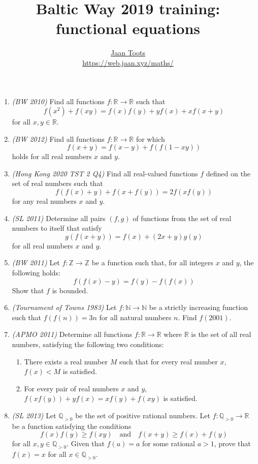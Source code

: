 \documentclass[a4paper]{article}
\title{Baltic Way 2019 training: functional equations}
\author{\href{mailto:jaan@jaan.xyz}{Jaan Toots} \\
\url{https://web.jaan.xyz/maths/}}
\date{\DTMdate{2019-11-14}}
\newcommand{\reals}{\ensuremath{\mathbb{R}}}
\newcommand{\ints}{\ensuremath{\mathbb{Z}}}
\newcommand{\nats}{\ensuremath{\mathbb{N}}}
\newcommand{\rats}{\ensuremath{\mathbb{Q}}}
\begin{document}
\maketitle

\begin{enumerate}

\item \emph{(BW 2010)} Find all functions $f : \reals \to \reals$ such that
$$ f(x^2) +f(xy) =f(x)f(y) +yf(x) +xf(x+y) $$ for all $x,y \in \reals$.

\item \emph{(BW 2012)} Find all functions $f : \reals \to \reals$ for
which $$f(x+y) = f(x-y) + f(f(1-xy))$$ holds for all real numbers $x$ and $y$.

\item \emph{(Hong Kong 2020 TST 2 Q4)} Find all real-valued functions $f$
defined on the set of real numbers such that $$f(f(x)+y)+f(x+f(y))=2f(xf(y))$$
for any real numbers $x$ and $y$.

\item \emph{(SL 2011)} Determine all pairs $(f, g)$ of functions from the set
of real numbers to itself that satisfy $$g(f(x+y)) = f(x) + (2x+y)g(y)$$ for
all real numbers $x$ and $y$.

\item \emph{(BW 2011)} Let $f : \ints \to \ints$ be a function such that, for
all integers $x$ and $y$, the following holds: $$ f(f(x)-y) = f(y)-f(f(x)) $$
Show that $f$ is bounded.

\item \emph{(Tournament of Towns 1983)} Let $f: \nats \to \nats$ be a strictly
increasing function such that $f(f(n))=3n$ for all natural numbers $n$. Find
$f(2001)$.

\item \emph{(APMO 2011)} Determine all functions $f : \reals \to \reals$ where
\reals{} is the set of all real numbers, satisfying the following two conditions:
\begin{enumerate}
\item There exists a real number $M$ such that for every real number $x$, $f(x)
< M$ is satisfied.
\item For every pair of real numbers $x$ and $y$, $f(xf(y))+yf(x) =
xf(y)+f(xy)$ is satisfied.
\end{enumerate}

\item \emph{(SL 2013)} Let $\rats_{>0}$ be the set of positive rational
numbers. Let $f : \rats_{>0} \to \reals$ be a function satisfying the
conditions $$f(x)f(y) \ge f(xy) \quad\text{and}\quad f(x+y) \ge f(x)+f(y)$$ for
all $x,y \in \rats_{>0}$. Given that $f(a) = a$ for some rational $a > 1$,
prove that $f(x) = x$ for all $x \in \rats_{>0}$.


\end{enumerate}
\end{document}
